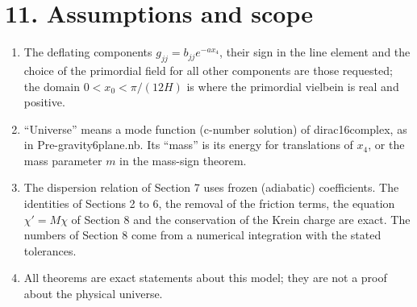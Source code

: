 \documentclass[10pt]{article}
\begin{document}
\section*{11. Assumptions and scope}

\begin{enumerate}
\item The deflating components $g_{jj} = b_{jj}e^{-ax_4}$, their sign in the line element and the choice of the primordial field for all other components are those requested; the domain $0 < x_0 < \pi/(12H)$ is where the primordial vielbein is real and positive.
\item ``Universe'' means a mode function (c-number solution) of dirac16complex, as in Pre-gravity6plane.nb. Its ``mass'' is its energy for translations of $x_4$, or the mass parameter $m$ in the mass-sign theorem.
\item The dispersion relation of Section 7 uses frozen (adiabatic) coefficients. The identities of Sections 2 to 6, the removal of the friction terms, the equation $\chi' = M\chi$ of Section 8 and the conservation of the Krein charge are exact. The numbers of Section 8 come from a numerical integration with the stated tolerances.
\item All theorems are exact statements about this model; they are not a proof about the physical universe.
\end{enumerate}
\end{document}
